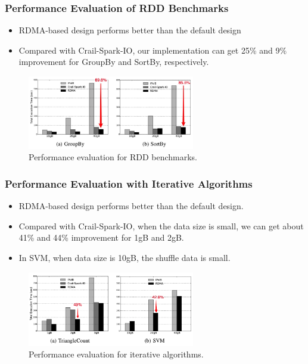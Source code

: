 \documentclass{beamer}
\begin{document}
\begin{frame}
  \frametitle{Performance Evaluation of RDD Benchmarks}
  \begin{itemize}
  \item RDMA-based design performs better than the default design
  \item Compared with Crail-Spark-IO, our implementation can get 25\% and 9\%
    improvement for GroupBy and SortBy, respectively.
  \end{itemize}
  \begin{figure}[!b]
    \centering 
    \includegraphics[width=0.65\textwidth]{rdd-benchmarks.png}
    \caption{Performance evaluation for RDD benchmarks.}
    \label{fig:rdd-benchmarks}
  \end{figure}
\end{frame}

\begin{frame}
  \frametitle{Performance Evaluation with Iterative Algorithms}
  \begin{itemize}
  \item RDMA-based design performs better than the default design.
  \item Compared with Crail-Spark-IO, when the data size is small, we can get about 41\% and 44\% improvement for 1gB and 2gB.
  \item In SVM, when data size is 10gB, the shuffle data is small.
  \end{itemize}
  \begin{figure}[!b]
    \centering 
    \includegraphics[width=0.65\textwidth]{iterative-algorithms.png}
    \caption{Performance evaluation for iterative algorithms.}
    \label{fig:iterative-algorithms}
  \end{figure}
\end{frame}
\end{document}
